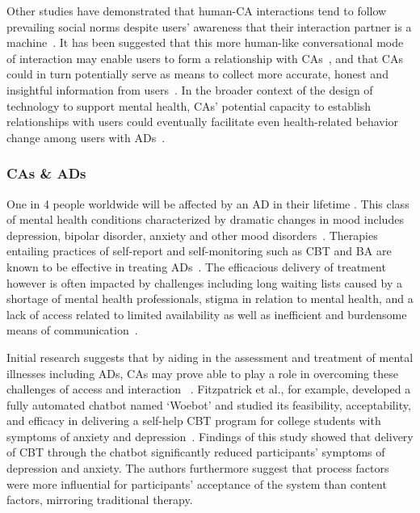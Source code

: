         Other studies have demonstrated that human-CA interactions tend to follow prevailing social norms despite users' awareness that their interaction partner is a machine~\cite{nass1993anthropomorphism, reeves1996media}. It has been suggested that this more human-like conversational mode of interaction may enable users to form a relationship with \ac{CA}s~\cite{waytz2010sees, bickmore2005establishing}, and that \ac{CA}s could in turn potentially serve as means to collect more accurate, honest and insightful information from users~\cite{devault2014simsensei, lucas2014s}. In the broader context of the design of technology to support mental health, \ac{CA}s' potential capacity to establish relationships with users could eventually facilitate even health-related behavior change among users with \acp{AD}~\cite{thieme2015designing, bickmore2005establishing}.
        
        \subsubsection{\aclp{CA} \& \aclp{AD}}\label{sec:ca_ad}
            
            One in 4 people worldwide will be affected by an \ac{AD} in their lifetime \cite{world2001world}. This class of mental health conditions characterized by dramatic changes in mood includes depression, bipolar disorder, anxiety and other mood disorders~\cite{harrington1994affective}. Therapies entailing practices of self-report and self-monitoring such as \ac{CBT} and \ac{BA} are known to be effective in treating \ac{AD}s~\cite{cuijpers2010guided, weiss2016can,tindall2017behavioural}. The efficacious delivery of treatment however is often impacted by challenges including long waiting lists caused by a shortage of mental health professionals, stigma in relation to mental health, and a lack of access related to limited availability as well as inefficient and burdensome means of communication~\cite{inkster2018empathy}. 
            
            Initial research suggests that by aiding in the assessment and treatment of mental illnesses including \ac{AD}s, \ac{CA}s may prove able to play a role in overcoming these challenges of access and interaction ~\cite{hoermann2017application, vaidyam2019chatbots}. Fitzpatrick et al., for example, developed a fully automated chatbot named `Woebot' and studied its feasibility, acceptability, and efficacy in delivering a self-help \ac{CBT} program for college students with symptoms of anxiety and depression~\cite{fitzpatrick2017delivering}. Findings of this study showed that delivery of \ac{CBT} through the chatbot significantly reduced participants' symptoms of depression and anxiety. The authors furthermore suggest that process factors were more influential for participants' acceptance of the system than content factors, mirroring traditional therapy. 
            
